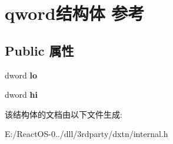 \hypertarget{structqword}{}\section{qword结构体 参考}
\label{structqword}
\subsection*{Public 属性}
\begin{DoxyCompactItemize}
\item 
\mbox{\label{structqword_a586d25e7eb9bfc3f332b105848d5948d}} 
dword {\bfseries lo}
\item 
\mbox{\label{structqword_a677af5f65277eaf572db9c6057e77c4f}} 
dword {\bfseries hi}
\end{DoxyCompactItemize}


该结构体的文档由以下文件生成\+:\begin{DoxyCompactItemize}
\item 
E\+:/\+React\+O\+S-\/0../dll/3rdparty/dxtn/internal.\+h\end{DoxyCompactItemize}
